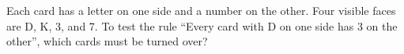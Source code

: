 Each card has a letter on one side and a number on the other. Four visible faces are D, K, 3, and 7. To test the rule ``Every card with D on one side has 3 on the other'', which cards must be turned over?
